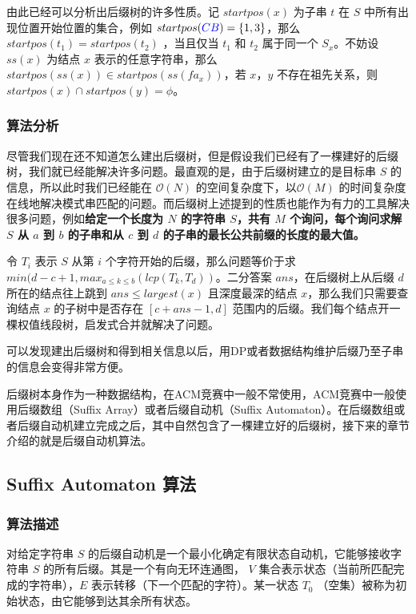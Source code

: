 \documentclass[UTF8]{ctexart}
\begin{document}
由此已经可以分析出后缀树的许多性质。记 $startpos(x)$ 为子串 $t$ 在 $S$ 中所有出现位置开始位置的集合，例如 $startpos(\textcolor[rgb]{0,0,1}{CB})=\{ 1, 3 \}$，那么 $startpos(t_1) = startpos(t_2)$ ，当且仅当 $t_1$ 和 $t_2$ 属于同一个 $S_x$。不妨设 $ss(x)$ 为结点 $x$ 表示的任意字符串，那么 $startpos(ss(x)) \in startpos(ss(fa_x))$，若 $x$，$y$ 不存在祖先关系，则 $startpos(x) \cap startpos(y) = \phi$。

\subsubsection {算法分析}

尽管我们现在还不知道怎么建出后缀树，但是假设我们已经有了一棵建好的后缀树，我们就已经能解决许多问题。最直观的是，由于后缀树建立的是目标串 $S$ 的信息，所以此时我们已经能在 $\mathcal{O}(N)$ 的空间复杂度下，以$\mathcal{O}(M)$ 的时间复杂度在线地解决模式串匹配的问题。而后缀树上述提到的性质也能作为有力的工具解决很多问题，例如\textbf{给定一个长度为 $N$ 的字符串 $S$，共有 $M$ 个询问，每个询问求解 $S$ 从 $a$ 到 $b$ 的子串和从 $c$ 到 $d$ 的子串的最长公共前缀的长度的最大值。} \par

令 $T_i$ 表示 $S$ 从第 $i$ 个字符开始的后缀，那么问题等价于求 $min(d-c+1,max_{a \leq k \leq b}(lcp(T_k, T_d))$。二分答案 $ans$，在后缀树上从后缀 $d$ 所在的结点往上跳到 $ans \leq largest(x)$ 且深度最深的结点 $x$，那么我们只需要查询结点 $x$ 的子树中是否存在 $[c+ans-1,d]$ 范围内的后缀。我们每个结点开一棵权值线段树，启发式合并就解决了问题。 \par

可以发现建出后缀树和得到相关信息以后，用DP或者数据结构维护后缀乃至子串的信息会变得非常方便。 \par

后缀树本身作为一种数据结构，在ACM竞赛中一般不常使用，ACM竞赛中一般使用后缀数组（Suffix Array）或者后缀自动机（Suffix Automaton）。在后缀数组或者后缀自动机建立完成之后，其中自然包含了一棵建立好的后缀树，接下来的章节介绍的就是后缀自动机算法。

\subsection {Suffix Automaton 算法}

\subsubsection {算法描述}

对给定字符串 $S$ 的后缀自动机是一个最小化确定有限状态自动机，它能够接收字符串 $S$ 的所有后缀。其是一个有向无环连通图， $V$ 集合表示状态（当前所匹配完成的字符串），$E$ 表示转移（下一个匹配的字符）。某一状态 $T_0$ （空集）被称为初始状态，由它能够到达其余所有状态。 \par
\end{document}
